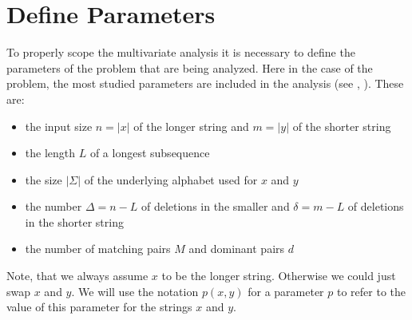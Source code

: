 \section{Define Parameters}
To properly scope the multivariate analysis it is necessary to define the parameters of the problem that are being analyzed.
Here in the case of the \lcs{} problem, the most studied parameters are included in the analysis (see \cite{Bergroth.2000}, \cite{Paterson.1994}). 
These are:
\begin{itemize}
	\item the input size $n = |x|$ of the longer string and $m = |y|$ of the shorter string
	\item the length $L$ of a longest subsequence
	\item the size $|\Sigma|$ of the underlying alphabet used for $x$ and $y$
	\item the number $\Delta = n - L$ of deletions in the smaller and $\delta = m - L$ of deletions in the shorter string
	\item the number of matching pairs $M$ and dominant pairs $d$ 
\end{itemize}
Note, that we always assume $x$ to be the longer string. Otherwise we could just swap $x$ and $y$.
We will use the notation $p(x,y)$ for a parameter $p$ to refer to the value of this parameter for the strings $x$ and $y$.
